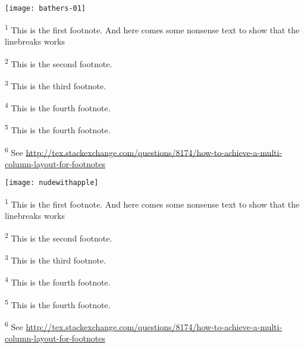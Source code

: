 \begin{sidewaysfigure}

\centering
\texttt{[image: bathers-01]}
\vspace{3\baselineskip}
\footnoterule\footnotesize
\begin{minipage}[t]{0.49\linewidth}
\textsuperscript{1} This is the first footnote. And here comes some nonsense text
                    to show that the linebreaks works \par
\textsuperscript{2} This is the second footnote.\par
\end{minipage}\hfill
\begin{minipage}[t]{0.49\linewidth}
\textsuperscript{3} This is the third footnote. \par
\textsuperscript{4} This is the fourth footnote.\par
\textsuperscript{5} This is the fourth footnote.\par
\textsuperscript{6} See \url{http://tex.stackexchange.com/questions/8174/how-to-achieve-a-multi-column-layout-for-footnotes}\par
\end{minipage}
\end{sidewaysfigure}


\begin{sidewaysfigure}

\centering
\texttt{[image: nudewithapple]}
\vspace{3\baselineskip}
\footnoterule\footnotesize
\begin{minipage}[t]{0.49\linewidth}
\textsuperscript{1} This is the first footnote. And here comes some nonsense text
                    to show that the linebreaks works \par
\textsuperscript{2} This is the second footnote.\par
\end{minipage}\hfill
\begin{minipage}[t]{0.49\linewidth}
\textsuperscript{3} This is the third footnote. \par
\textsuperscript{4} This is the fourth footnote.\par
\textsuperscript{5} This is the fourth footnote.\par
\textsuperscript{6} See \url{http://tex.stackexchange.com/questions/8174/how-to-achieve-a-multi-column-layout-for-footnotes}\par
\end{minipage}
\end{sidewaysfigure}





